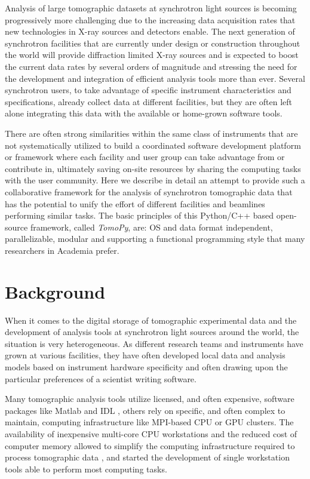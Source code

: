 \documentclass[pdf]{iucr}              %
\begin{document}
Analysis of large tomographic datasets at synchrotron light sources is becoming progressively more challenging  due to the increasing data acquisition rates that new technologies in X-ray sources and detectors enable. The next generation of synchrotron facilities that are currently under design or construction throughout the world will provide diffraction limited X-ray sources and is expected to boost the current data rates by several orders of magnitude and stressing the need for the development and integration of efficient analysis tools more than ever. Several synchrotron users, to take advantage of specific instrument characteristics and specifications,  already collect data at different facilities, but they are often left alone integrating this data with the available or home-grown software tools.

There are often strong similarities within the same class of instruments that are not systematically utilized to build a coordinated software development platform or framework where each facility and user group can take advantage from or contribute in, ultimately saving on-site resources by sharing the computing tasks with the user community. Here we describe in detail an attempt to provide such a collaborative framework for the analysis of synchrotron tomographic data that has the potential to unify the effort of different facilities and beamlines performing similar tasks. The basic principles of this Python/C++ based open-source framework, called {\it TomoPy}, are: OS and data format independent, parallelizable, modular and supporting a functional programming style that many researchers in Academia prefer. 


\section{Background}

When it comes to the digital storage of tomographic experimental data and the development of analysis tools at synchrotron light sources around the world, the situation is very heterogeneous. As different research teams and instruments have grown at various facilities, they have often developed local data and analysis models based on instrument hardware specificity and often drawing upon the particular preferences of a scientist writing software. 

Many tomographic analysis tools utilize licensed, and often expensive, software packages like Matlab \cite{matlab} and IDL \cite{exelis_vis}, others rely on specific, and often complex to maintain, computing infrastructure like MPI-based CPU or GPU clusters. The availability of inexpensive multi-core CPU workstations and the reduced cost of computer memory  allowed to simplify the computing infrastructure required to process tomographic data \cite{rivers_spie_2012}, and started the development of single workstation tools able to perform most computing tasks. 
\end{document}
